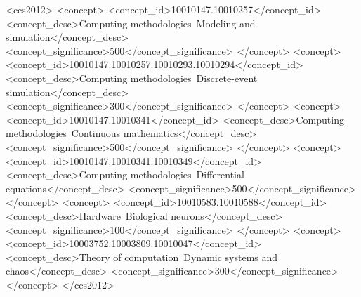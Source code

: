 \documentclass[sigplan,screen]{acmart}
\begin{document}
\begin{CCSXML}
<ccs2012>
 <concept>
  <concept_id>10010147.10010257</concept_id>
  <concept_desc>Computing methodologies~Modeling and simulation</concept_desc>
  <concept_significance>500</concept_significance>
 </concept>
 <concept>
  <concept_id>10010147.10010257.10010293.10010294</concept_id>
  <concept_desc>Computing methodologies~Discrete-event simulation</concept_desc>
  <concept_significance>300</concept_significance>
 </concept>
 <concept>
  <concept_id>10010147.10010341</concept_id>
  <concept_desc>Computing methodologies~Continuous mathematics</concept_desc>
  <concept_significance>500</concept_significance>
 </concept>
 <concept>
  <concept_id>10010147.10010341.10010349</concept_id>
  <concept_desc>Computing methodologies~Differential equations</concept_desc>
  <concept_significance>500</concept_significance>
 </concept>
 <concept>
  <concept_id>10010583.10010588</concept_id>
  <concept_desc>Hardware~Biological neurons</concept_desc>
  <concept_significance>100</concept_significance>
 </concept>
 <concept>
  <concept_id>10003752.10003809.10010047</concept_id>
  <concept_desc>Theory of computation~Dynamic systems and chaos</concept_desc>
  <concept_significance>300</concept_significance>
 </concept>
</ccs2012>
\end{CCSXML}

\end{document}
